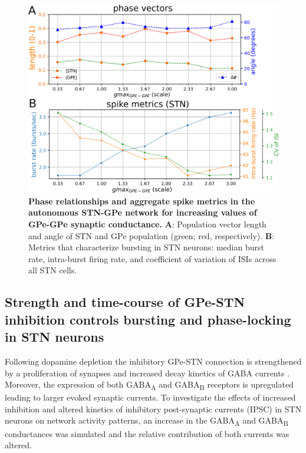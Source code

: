 \begin{figure}
\centering
\includegraphics[width=\textwidth]{ch_detailed_model/figs_split/fig_endogenous_sweep-gmax-gpe-gpe_C-metrics.png}
\caption{
\textbf{Phase relationships and aggregate spike metrics in the autonomous STN-GPe network for increasing values of GPe-GPe synaptic conductance.}
\textbf{A}: Population vector length and angle of STN and GPe population (green; red, respectively).
\textbf{B}: Metrics that characterize bursting in STN neurons: median burst rate, intra-burst firing rate, and coefficient of variation of ISIs across all STN cells.
}
\label{fig:endogenous_sweep-gmax-gpe-gpe_C-metrics}
\end{figure}

%
%
%
%
%
%

%
%
\subsection{Strength and time-course of GPe-STN inhibition controls bursting and phase-locking in STN neurons}
%
\label{sec:endogenous_sweep-gpe-stn-gmax-gabaAB}

%
%
%
%
Following dopamine depletion the inhibitory GPe-STN connection is strengthened by a proliferation of synapses and increased decay kinetics of GABA currents \cite{fan_proliferation_2012}. Moreover, the expression of both GABA\textsubscript{A} \cite{fan_proliferation_2012} and GABA\textsubscript{B} \cite{shen_dopamine_2005} receptors is upregulated leading to larger evoked synaptic currents. To investigate the effects of increased inhibition and altered kinetics of inhibitory post-synaptic currents (IPSC) in STN neurons on network activity patterns, an increase in the GABA\textsubscript{A} and GABA\textsubscript{B} conductances was simulated and the relative contribution of both currents was altered.
%
%
%


